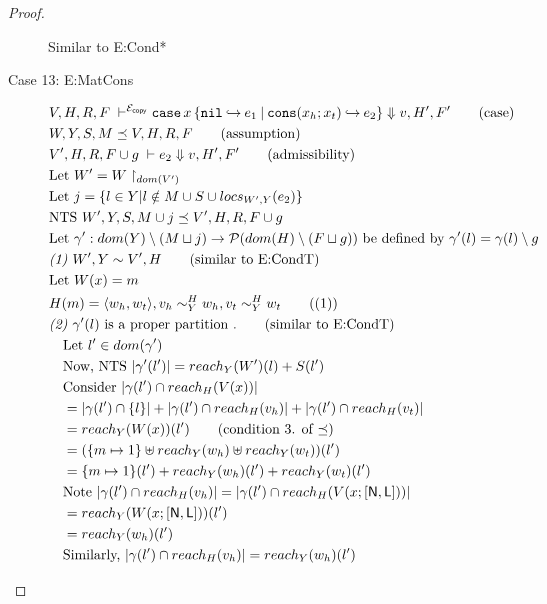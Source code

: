 \documentclass[11pt]{article}
\newcommand{\ms}[1]{\ensuremath{\mathsf{#1}}}
\newcommand{\veq}[4]{#3 \sim^{#1}_{#2} #4}
\newcommand{\copySem}{\ensuremath{\mathcal{E}_{\ms{copy}}}}
\theoremstyle{definition}
\begin{document}
\begin{proof}
\begin{description}
  Similar to E:Cond*
  \item[Case 13: E:MatCons]
  \begin{align*}
		&V,H,R,F \; \vdash^{\copySem} \listcaseexcst{x}{e_1}{x_h}{x_t}{e_2} \Downarrow v,H',F' \tag{case}\\
		&W,Y,S,M \preceq V,H,R,F \tag{assumption}\\
		&V',H,R,F \cup g \; \vdash e_2 \Downarrow v, H',F' \tag{admissibility}\\
		&\text{Let } W' = W \restriction_{dom(V')}\\
		&\text{Let } j = \{l \in Y | l \notin M \cup S \cup locs_{W',Y}(e_2) \}\\
		&\text{NTS } W',Y,S,M \cup j \preceq V',H,R,F \cup g\\
		&\text{Let } \gamma' : dom(Y) \setminus (M \sqcup j) 
		\to \mathcal{P}(dom(H) \setminus (F \sqcup g)) \text{ be defined by } 
		\gamma'(l) = \gamma(l) \setminus g\\
		&\emph{(1) } W',Y \sim V',H \tag{similar to E:CondT}\\
		&\text{Let } W(x) = m\\
		&H(m) = \pairexcst{w_h}{w_t}, \veq{H}{Y}{v_h}{w_h},\veq{H}{Y}{v_t}{w_t} \tag{(1)} \\
		&\emph{(2) } \gamma'(l) \text{ is a proper partition }. \tag{similar to E:CondT}\\
		&\quad \text{Let } l' \in dom(\gamma')\\
		&\quad \text{Now, NTS } |\gamma'(l')| = reach_{Y}(W')(l) + S(l')\\
		&\quad \text{Consider } |\gamma(l') \cap reach_H(V(x))|\\
		&\quad = |\gamma(l') \cap \{l\}| + |\gamma(l') \cap reach_H(v_h)| 
			+ |\gamma(l') \cap reach_H(v_t)|\\ 
		&\quad = reach_Y(W(x))(l') \tag{condition 3. of $\preceq$}\\
		&\quad = (\{m \mapsto 1\} \uplus reach_Y(w_h) \uplus reach_Y(w_t))(l')\\
		&\quad = \{m \mapsto 1\}(l') + reach_Y(w_h)(l') + reach_Y(w_t)(l')\\
		&\quad\text{Note } |\gamma(l') \cap reach_H(v_h)| = 
			|\gamma(l') \cap reach_H(V(x;[\ms{N},\ms{L}]))|\\
		&\quad = reach_Y(W(x;[\ms{N},\ms{L}]))(l')\\
		&\quad = reach_Y(w_h)(l')\\
		&\quad\text{Similarly, } |\gamma(l') \cap reach_H(v_h)| = reach_Y(w_h)(l')\\

\end{align*}
\end{description}
\end{proof}
\end{document}
